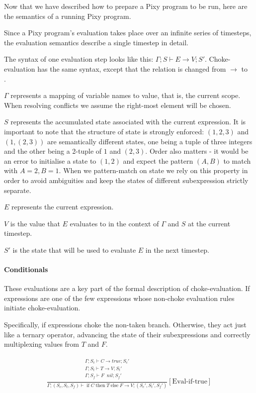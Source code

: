 \documentclass{scrartcl}
\DeclareMathOperator{\ifop}{if}
\DeclareMathOperator{\thenop}{then}
\DeclareMathOperator{\elseop}{else}
\DeclareMathOperator{\ceval}{\overset{C}{\rightarrow}}
\begin{document}
    Now that we have described how to prepare a Pixy program to be run, here are the semantics of a running Pixy program.
    
    Since a Pixy program's evaluation takes place over an infinite series of timesteps, the evaluation semantics describe a single timestep in detail.
    
    The syntax of one evaluation step looks like this: $\Gamma; S \vdash E \rightarrow V; S'$. Choke-evaluation has the same syntax, except that the relation is changed from $\rightarrow$ to $\ceval$.
    
    $\Gamma$ represents a mapping of variable names to value, that is, the current scope. When resolving conflicts we assume the right-most element will be chosen.
    
    $S$ represents the accumulated state associated with the current expression. It is important to note that the structure of state is strongly enforced: $(1, 2, 3)$ and $(1,(2, 3))$ are semantically different states, one being a tuple of three integers and the other being a 2-tuple of $1$ and $(2,3)$. Order also matters - it would be an error to initialise a state to $(1,2)$ and expect the pattern $(A, B)$ to match with $A=2, B=1$. When we pattern-match on state we rely on this property in order to avoid ambiguities and keep the states of different subexpression strictly separate.
    
    $E$ represents the current expression.
    
    $V$ is the value that $E$ evaluates to in the context of $\Gamma$ and $S$ at the current timestep.
    
    $S'$ is the state that will be used to evaluate $E$ in the next timestep.
    
    \paragraph{Conditionals}
    
    These evaluations are a key part of the formal description of choke-evaluation. If expressions are one of the few expressions whose non-choke evaluation rules initiate choke-evaluation.
    
    Specifically, if expressions choke the non-taken branch. Otherwise, they act just like a ternary operator, advancing the state of their subexpressions and correctly multiplexing values from $T$ and $F$.
    
    \begin{align*}
    \frac{
        \begin{matrix}
        \Gamma; S_c \vdash C \rightarrow true; S_c' \\
        \Gamma; S_t \vdash T \rightarrow V; S_t' \\
        \Gamma; S_f \vdash F \ceval nil; S_f' \\
        \end{matrix}
    }{
        \Gamma; (S_c, S_t, S_f) \vdash \ifop C \thenop T \elseop F \rightarrow V; (S_c', S_t', S_f')
    }[\text{Eval-if-true}]
    \end{align*}
    
\end{document}
